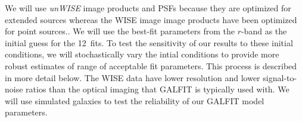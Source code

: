 \documentclass[11pt, preprint]{aastex}
\begin{document}
{We will use {\it unWISE} image products and PSFs \citep{lang14}
because they are optimized for extended sources whereas the WISE
image image products have been optimized for point sources..
We will use the best-fit parameters from the $r$-band as the initial
guess for the 12\micron \ fits. To test the sensitivity of our results to these
initial conditions, we will stochastically vary the intial
conditions to provide more robust estimates of range of acceptable
fit parameters.  This process is described in more detail below.
The WISE  data have lower resolution and
lower signal-to-noise ratios than the optical imaging that
GALFIT is typically used with. 
We will use simulated galaxies to test the reliability of our GALFIT
model parameters.



}
\end{document}
